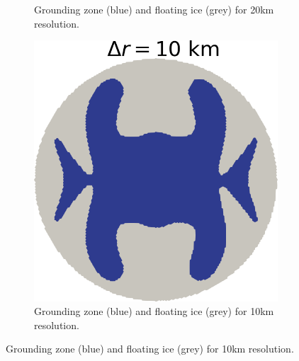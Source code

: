 \documentclass{article}
\begin{document}
\begin{figure}[!h]
\begin{subfigure}{0.25\textwidth}
		\caption{Grounding zone (blue) and floating ice (grey) for 20km resolution.}
		\label{fig:2}
	\end{subfigure}\hfil %
	\begin{subfigure}{0.25\textwidth}
		\includegraphics[width=\linewidth]{../fig/Grounded_zone_10km.png}
		\caption{Grounding zone (blue) and floating ice (grey) for 10km resolution.}
		\label{fig:3}
	\end{subfigure}
	

\end{figure}
\end{document}
